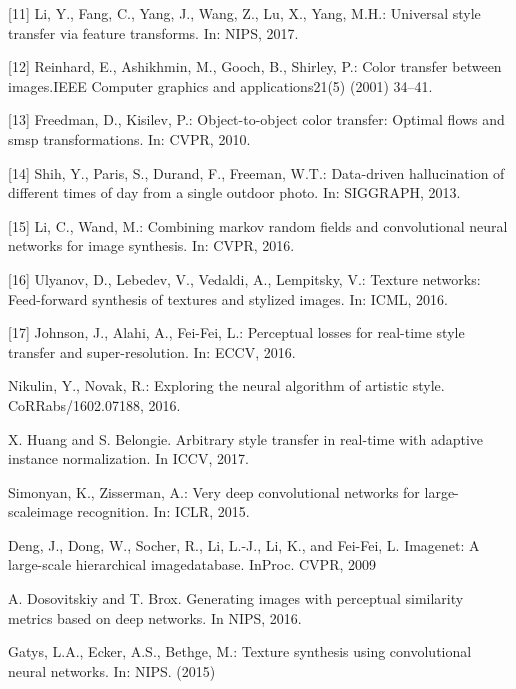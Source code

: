 \begin{thebibliography}{9}
[11] Li, Y., Fang, C., Yang, J., Wang, Z., Lu, X., Yang, M.H.:  Universal style transfer via feature transforms.  In: NIPS, 2017. 

[12] Reinhard, E., Ashikhmin, M., Gooch, B., Shirley, P.: Color transfer between images.IEEE Computer graphics and applications21(5) (2001) 34–41.

[13] Freedman, D., Kisilev, P.:  Object-to-object color transfer: Optimal flows and smsp transformations.  In: CVPR, 2010. 

[14] Shih,  Y.,  Paris,  S.,  Durand,  F.,  Freeman,  W.T.:   Data-driven  hallucination  of different times of day from a single outdoor photo.  In: SIGGRAPH, 2013.  

[15] Li,  C.,  Wand,  M.:   Combining  markov  random  fields  and  convolutional  neural networks for image synthesis.  In: CVPR, 2016. 

[16] Ulyanov, D., Lebedev, V., Vedaldi, A., Lempitsky, V.:  Texture networks: Feed-forward synthesis of textures and stylized images.  In: ICML, 2016.

[17] Johnson, J., Alahi, A., Fei-Fei, L.:  Perceptual losses for real-time style transfer and super-resolution.  In: ECCV, 2016.

Nikulin,  Y.,  Novak,  R.:  Exploring  the  neural  algorithm  of  artistic  style.  CoRRabs/1602.07188, 2016.

X. Huang and S. Belongie. Arbitrary style transfer in real-time with adaptive instance normalization. In
ICCV, 2017.

Simonyan, K., Zisserman, A.:  Very deep convolutional networks for large-scaleimage recognition.  In: ICLR, 2015.

Deng, J., Dong, W., Socher, R., Li, L.-J., Li, K., and Fei-Fei, L.  Imagenet:  A large-scale hierarchical imagedatabase.  InProc. CVPR, 2009

A. Dosovitskiy and T. Brox. Generating images with perceptual similarity metrics based on deep networks.
In NIPS, 2016.

Gatys, L.A., Ecker, A.S., Bethge, M.: Texture synthesis using convolutional neural
networks. In: NIPS. (2015)
\end{thebibliography}